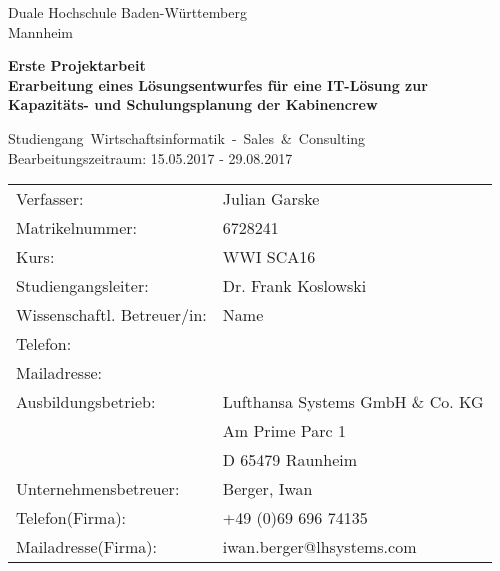 \documentclass [12pt, a4paper, oneside, titlepage, ngerman]{article}
\begin{document}
\begin{titlepage}
\Large
\begin{minipage}{\textwidth} \centering \Large
     Duale Hochschule Baden-Württemberg \\  
     Mannheim 
\end{minipage} \vspace{1cm}

\begin{minipage}{\textwidth} \centering \Large
     \textbf{Erste Projektarbeit \\ Erarbeitung eines Lösungsentwurfes für eine IT-Lösung zur Kapazitäts- und Schulungsplanung der Kabinencrew}
\end{minipage} \vspace{1cm}

\begin{minipage}{\textwidth} \centering \Large
     \mbox{Studiengang Wirtschaftsinformatik - Sales \& Consulting}\\  \large Bearbeitungszeitraum: 15.05.2017 - 29.08.2017
\end{minipage} \vspace{1cm}


\begin{table}[h!]
  \begin{tabular}{ll}
Verfasser: & Julian Garske \\
Matrikelnummer: & 6728241 \vspace{0.5cm} \\ 
Kurs: & WWI SCA16 \\
 Studiengangsleiter:& Dr. Frank Koslowski \vspace{0.5cm} \\
Wissenschaftl. Betreuer/in: &Name \\ 
Telefon:& \\ 
Mailadresse:& \vspace{0.5cm}\\
Ausbildungsbetrieb: &Lufthansa Systems GmbH \& Co. KG \\ 
& Am Prime Parc 1 \\ 
& D 65479 Raunheim \vspace{0.5cm}\\
Unternehmensbetreuer: &Berger, Iwan \\ 
Telefon(Firma): &+49 (0)69 696 74135 \\
 Mailadresse(Firma):& iwan.berger@lhsystems.com \\
  \end{tabular}
\end{table}



\end{titlepage}
\end{document}

